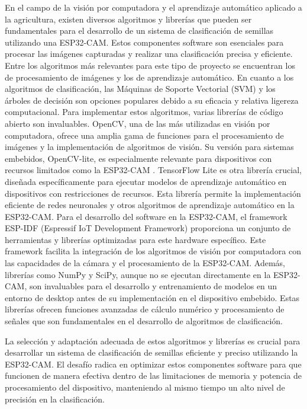 En el campo de la visión por computadora y el aprendizaje automático aplicado a la agricultura, existen diversos algoritmos y librerías que pueden ser fundamentales para el desarrollo de un sistema de clasificación de semillas utilizando una ESP32-CAM. Estos componentes software son esenciales para procesar las imágenes capturadas y realizar una clasificación precisa y eficiente. Entre los algoritmos más relevantes para este tipo de proyecto se encuentran los de procesamiento de imágenes y los de aprendizaje automático. En cuanto a los algoritmos de clasificación, las Máquinas de Soporte Vectorial (SVM) y los árboles de decisión son opciones populares debido a su eficacia y relativa ligereza computacional. Para implementar estos algoritmos, varias librerías de código abierto son invaluables. OpenCV, una de las más utilizadas en visión por computadora, ofrece una amplia gama de funciones para el procesamiento de imágenes y la implementación de algoritmos de visión. Su versión para sistemas embebidos, OpenCV-lite, es especialmente relevante para dispositivos con recursos limitados como la ESP32-CAM \cite{garcia2015learning}.
TensorFlow Lite es otra librería crucial, diseñada específicamente para ejecutar modelos de aprendizaje automático en dispositivos con restricciones de recursos. Esta librería permite la implementación eficiente de redes neuronales y otros algoritmos de aprendizaje automático en la ESP32-CAM.
Para el desarrollo del software en la ESP32-CAM, el framework ESP-IDF (Espressif IoT Development Framework) proporciona un conjunto de herramientas y librerías optimizadas para este hardware específico. Este framework facilita la integración de los algoritmos de visión por computadora con las capacidades de la cámara y el procesamiento de la ESP32-CAM. Además, librerías como NumPy y SciPy, aunque no se ejecutan directamente en la ESP32-CAM, son invaluables para el desarrollo y entrenamiento de modelos en un entorno de desktop antes de su implementación en el dispositivo embebido. Estas librerías ofrecen funciones avanzadas de cálculo numérico y procesamiento de señales que son fundamentales en el desarrollo de algoritmos de clasificación.

La selección y adaptación adecuada de estos algoritmos y librerías es crucial para desarrollar un sistema de clasificación de semillas eficiente y preciso utilizando la ESP32-CAM. El desafío radica en optimizar estos componentes software para que funcionen de manera efectiva dentro de las limitaciones de memoria y potencia de procesamiento del dispositivo, manteniendo al mismo tiempo un alto nivel de precisión en la clasificación.

